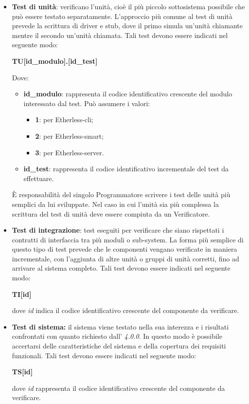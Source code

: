         \begin{itemize}
          \item \textbf{Test di unità}: verificano l'unità, cioè il più piccolo sottosistema possibile che può essere testato separatamente. L'approccio più comune al test di unità prevede la scrittura di driver e stub, dove il primo simula un'unità chiamante mentre il secondo un'unità chiamata. Tali test devono essere indicati nel seguente modo: 
          \begin{center}
          	\textbf{TU[id\_modulo].[id\_test]}
          \end{center}
      	  Dove:
      	  \begin{itemize}
      	  	\item \textbf{id\_modulo}: rappresenta il codice identificativo crescente del modulo interessato dal test. Può assumere i valori:
        	\begin{itemize}
        		\item{\textbf{1}: per Etherless-cli;}
        		\item{\textbf{2}: per Etherless-smart;}
        		\item{\textbf{3}: per Etherless-server.}
        	\end{itemize}
      	  	\item \textbf{id\_test}: rappresenta il codice identificativo incrementale del test da effettuare.
      	  \end{itemize}
      	  È responsabilità del singolo Programmatore scrivere i test delle unità più semplici da lui sviluppate. Nel caso in cui l'unità sia più complessa la scrittura del test di unità deve essere compiuta da un Verificatore. 
        
          \item \textbf{Test di integrazione}: test eseguiti per verificare che siano rispettati i contratti di interfaccia tra più moduli o sub-system. La forma più semplice di questo tipo di test prevede che le componenti vengano verificate in maniera incrementale, con l'aggiunta di altre unità o gruppi di unità corretti, fino ad arrivare al sistema completo. Tali test devono essere indicati nel seguente modo: 
          \begin{center}
          	\textbf{TI[id]}
          \end{center}
      		dove \textit{id} indica il codice identificativo crescente del componente da verificare. 
         
			\item \textbf{Test di sistema:} il sistema viene testato nella sua interezza e i  risultati confrontati con quanto richiesto dall'\AdR{} \textit{4.0.0}. In questo modo è possibile accertarsi delle caratteristiche del sistema e della copertura dei requisiti funzionali. Tali test devono essere indicati nel seguente modo: 
			\begin{center}
				\textbf{TS[id]}
			\end{center}
			dove \textit{id} rappresenta il codice identificativo crescente del componente da verificare. 
         

\end{itemize}
